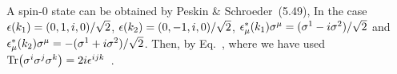 \documentclass[11pt]{article}
\begin{document}
{	A spin-0 state can be obtained by Peskin \& Schroeder~(5.49),
	In the case $\epsilon(k_1) = (0, 1, i, 0) / \sqrt{2}$, $\epsilon(k_2) = (0, -1, i, 0) / \sqrt{2}$, $\epsilon_\mu^*(k_1) \sigma^\mu = (\sigma^1 - i \sigma^2) / \sqrt{2}$ and $\epsilon_\mu^*(k_2) \sigma^\mu = -(\sigma^1 + i \sigma^2) / \sqrt{2}$.  Then, by Eq.~,
	where we have used $\Tr(\sigma^i \sigma^j \sigma^k) = 2i \epsilon^{i j k}$~\cite{Pauli}.
	
}
\end{document}
